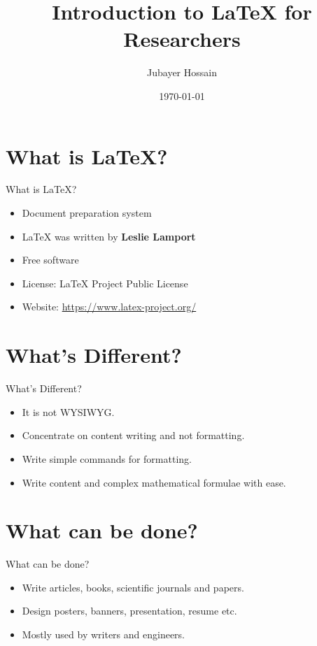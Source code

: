 \documentclass[dvipsnames, aspectratio=169]{beamer}
\title{Introduction to {\LaTeX} for Researchers}
\author[Jubayer Hossain]{\Large Jubayer Hossain}
\institute[HDRO]{\Large Health Data Research Organization}
\date{\today}
\begin{document}
	\begin{frame}
		\maketitle 
	\end{frame}

	\section{What is {\LaTeX}?} 
	\begin{frame}[t]{What is {\LaTeX}?}\vspace{10pt}
		\begin{itemize}
			\item Document preparation system 
			\item {\LaTeX} was written by \textbf{Leslie Lamport} 
			\item Free software 
			\item License: LaTeX Project Public License 
			\item Website: \url{https://www.latex-project.org/}
		\end{itemize}
	\end{frame}

	\section{What's Different?} 
	\begin{frame}[t]{What's Different?}\vspace{10pt}
		\begin{itemize}
			\item It is not WYSIWYG.
			\item Concentrate on content writing and not formatting.
			\item Write simple commands for formatting.
			\item Write content and complex mathematical formulae with ease. 
		\end{itemize}
	\end{frame}

	\section{What can be done?} 
	\begin{frame}[t]{What can be done?}\vspace{10pt} 
		\begin{itemize}
			\item Write articles, books, scientific journals and papers.
			\item Design posters, banners, presentation, resume etc.
			\item Mostly used by writers and engineers.
		\end{itemize}
	\end{frame}
\end{document}
